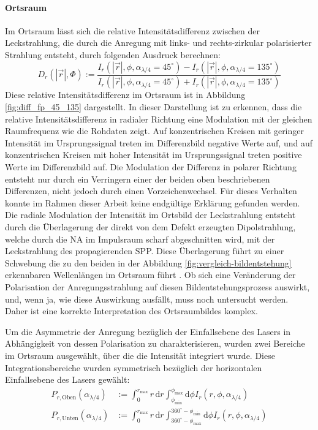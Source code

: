 \documentclass[titlepage,  ngerman]{article}
\begin{document}
		\paragraph{Ortsraum}
		Im Ortsraum lässt sich die relative Intensitätsdifferenz zwischen der Leckstrahlung, die durch die Anregung mit links- und rechts-zirkular polarisierter Strahlung entsteht, durch folgenden Ausdruck berechnen:
		\begin{equation}
		 	\label{eq:diff_measure}
			D_r\left(|\vec{r}|, \Phi\right) := \dfrac{I_r(|\vec{r}|, \phi, \alpha_{\lambda /4} = 45^\circ) - I_r(|\vec{r}|, \phi, \alpha_{\lambda /4} = 135^\circ)}{I_r(|\vec{r}|, \phi, \alpha_{\lambda /4} = 45^\circ) + I_r(|\vec{r}|, \phi, \alpha_{\lambda /4} = 135^\circ)}
		\end{equation} 
		 Diese relative Intensitätsdifferenz im Ortsraum ist in Abbildung \ref{fig:diff_fp_45_135} dargestellt. In dieser Darstellung ist zu erkennen, dass die relative Intensitätsdifferenz in radialer Richtung eine Modulation mit der gleichen Raumfrequenz wie die Rohdaten zeigt. Auf konzentrischen Kreisen mit geringer Intensität im Ursprungssignal treten im Differenzbild negative Werte auf, und auf konzentrischen Kreisen mit hoher Intensität im Ursprungssignal treten positive Werte im Differenzbild auf. Die Modulation der Differenz in polarer Richtung entsteht nur durch ein Verringern einer der beiden oben beschriebenen Differenzen, nicht jedoch durch einen Vorzeichenwechsel. Für dieses Verhalten konnte im Rahmen dieser Arbeit keine endgültige Erklärung gefunden werden. Die radiale Modulation der Intensität im Ortsbild der Leckstrahlung entsteht durch die Überlagerung der direkt von dem Defekt erzeugten Dipolstrahlung, welche durch die NA im Impulsraum scharf abgeschnitten wird, mit der Leckstrahlung des propagierenden SPP. Diese Überlagerung führt zu einer Schwebung die zu den beiden in der Abbildung \ref{fig:vergleich-bildentstehung} erkennbaren Wellenlängen im Ortsraum führt \cite{Hohenau.2011}. Ob sich eine Veränderung der Polarisation der Anregungsstrahlung auf diesen Bildentstehungsprozess auswirkt, und, wenn ja, wie diese Auswirkung ausfällt, muss noch untersucht werden. Daher ist eine korrekte Interpretation des Ortsraumbildes komplex. 
		 
		 Um die Asymmetrie der Anregung bezüglich der Einfallsebene des Lasers in Abhängigkeit von dessen Polarisation zu charakterisieren, wurden zwei Bereiche im Ortsraum ausgewählt, über die die Intensität integriert wurde. Diese Integrationsbereiche wurden symmetrisch bezüglich der horizontalen Einfallsebene des Lasers gewählt:		 
		 \begin{align}
		 	P_{r, \mathrm{Oben}}(\alpha_{\lambda/4}) &:= \int_{0}^{r_\mathrm{max}}r \, \mathrm{d}r \int_{\phi_\mathrm{min}}^{\phi_\mathrm{max}} \mathrm{d}\phi I_r(r, \phi, \alpha_{\lambda /4}) \\
		 	\nonumber
		 	P_{r, \mathrm{Unten}}(\alpha_{\lambda/4}) &:= \int_{0}^{r_\mathrm{max}}r \, \mathrm{d}r \int_{360^\circ -\phi_\mathrm{max}}^{360^\circ - \phi_\mathrm{min}} \mathrm{d}\phi I_r(r, \phi, \alpha_{\lambda/4})		 	
		 \end{align}
	 
\end{document}
